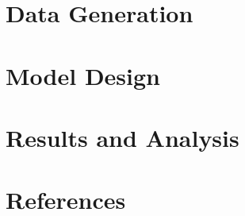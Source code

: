 \documentclass[conference]{IEEEtran}
\begin{document}
	\section{Data Generation}
	\section{Model Design}
	\section{Results and Analysis}
	
	
	
	
	
	\section*{References}
	
	
	
	
	
\end{document}
